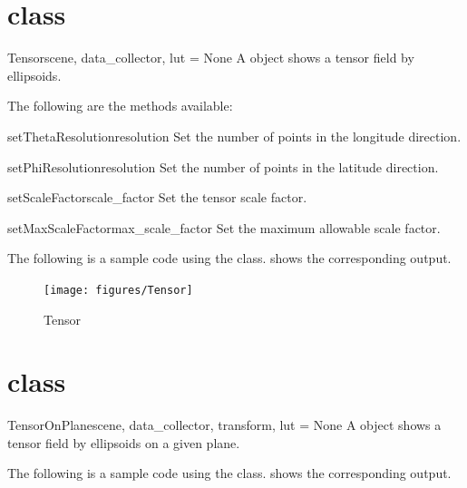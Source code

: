 \section{\TensorC class}
\begin{classdesc}{Tensor}{scene, data_collector, lut = None}
A \TensorC object shows a tensor field by ellipsoids.
\end{classdesc}

The following are the methods available:
\begin{methoddesc}[Tensor]{setThetaResolution}{resolution}
Set the number of points in the longitude direction.
\end{methoddesc}

\begin{methoddesc}[Tensor]{setPhiResolution}{resolution}
Set the number of points in the latitude direction.
\end{methoddesc}

\begin{methoddesc}[Tensor]{setScaleFactor}{scale_factor}
Set the tensor scale factor.
\end{methoddesc}

\begin{methoddesc}[Tensor]{setMaxScaleFactor}{max_scale_factor}
Set the maximum allowable scale factor.
\end{methoddesc}

The following is a sample code using the \TensorC class.
 shows the corresponding output.


\begin{figure}[ht]
\begin{center}
\texttt{[image: figures/Tensor]}
\end{center}
\caption{Tensor}
\label{fig:tensor.1}
\end{figure}

\section{\TensorOnPlane class}
\begin{classdesc}{TensorOnPlane}{scene, data_collector, transform, lut = None}
A \TensorOnPlane object shows a tensor field by ellipsoids on a given plane.
\end{classdesc}

The following is a sample code using the \TensorOnPlane class.
 shows the corresponding output.


